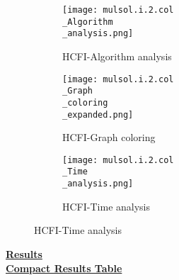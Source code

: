 \documentclass[10pt]{article}
\begin{document}
\graphicspath{{./Core1/Solutions/HCFI/mulsol.i.2.col}}
\begin{figure}[H]
\begin{subfigure}{.33\textwidth}
  \centering
  \texttt{[image: mulsol.i.2.col\\\_Algorithm\\\_analysis.png]}
  \caption{HCFI-Algorithm analysis}
   \label{fig:subfig1}
\end{subfigure}%
\begin{subfigure}{.33\textwidth}
  \centering
  \texttt{[image: mulsol.i.2.col\\\_Graph\\\_coloring\\\_expanded.png]}
  \caption{HCFI-Graph coloring}
  \label{fig:subfig2}
\end{subfigure}
\begin{subfigure}{.33\textwidth}
  \centering
  \texttt{[image: mulsol.i.2.col\\\_Time\\\_analysis.png]}
  \caption{HCFI-Time analysis}
  \end{subfigure}
\end{figure}
\vspace{2cm}
\begin{center}
\hyperlink{page.8}{\textbf{Results}}\\
\vspace{0.5cm}
\hyperlink{page.71}{\textbf{Compact Results Table}}
\end{center}
\pagebreak
\end{document}
